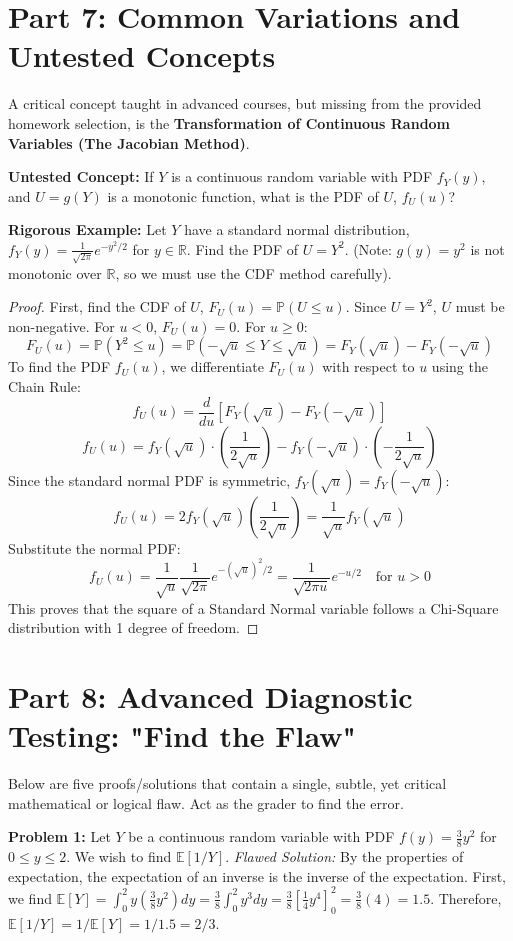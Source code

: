 \documentclass[11pt, a4paper]{article}
\theoremstyle{definition}
\theoremstyle{remark}
\newcommand{\R}{\mathbb{R}}
\newcommand{\E}{\mathbb{E}}
\newcommand{\Prob}{\mathbb{P}}
\begin{document}
\newpage
\section{Part 7: Common Variations and Untested Concepts}

A critical concept taught in advanced courses, but missing from the provided homework selection, is the \textbf{Transformation of Continuous Random Variables (The Jacobian Method)}. 

\textbf{Untested Concept:} If $Y$ is a continuous random variable with PDF $f_Y(y)$, and $U = g(Y)$ is a monotonic function, what is the PDF of $U$, $f_U(u)$?

\textbf{Rigorous Example:} Let $Y$ have a standard normal distribution, $f_Y(y) = \frac{1}{\sqrt{2\pi}} e^{-y^2/2}$ for $y \in \R$. Find the PDF of $U = Y^2$. (Note: $g(y) = y^2$ is not monotonic over $\R$, so we must use the CDF method carefully).

\begin{proof}
First, find the CDF of $U$, $F_U(u) = \Prob(U \le u)$.
Since $U = Y^2$, $U$ must be non-negative. For $u < 0$, $F_U(u) = 0$.
For $u \ge 0$:
\[ F_U(u) = \Prob(Y^2 \le u) = \Prob(-\sqrt{u} \le Y \le \sqrt{u}) = F_Y(\sqrt{u}) - F_Y(-\sqrt{u}) \]
To find the PDF $f_U(u)$, we differentiate $F_U(u)$ with respect to $u$ using the Chain Rule:
\[ f_U(u) = \frac{d}{du} \left[ F_Y(\sqrt{u}) - F_Y(-\sqrt{u}) \right] \]
\[ f_U(u) = f_Y(\sqrt{u}) \cdot \left( \frac{1}{2\sqrt{u}} \right) - f_Y(-\sqrt{u}) \cdot \left( -\frac{1}{2\sqrt{u}} \right) \]
Since the standard normal PDF is symmetric, $f_Y(\sqrt{u}) = f_Y(-\sqrt{u})$:
\[ f_U(u) = 2 f_Y(\sqrt{u}) \left( \frac{1}{2\sqrt{u}} \right) = \frac{1}{\sqrt{u}} f_Y(\sqrt{u}) \]
Substitute the normal PDF:
\[ f_U(u) = \frac{1}{\sqrt{u}} \frac{1}{\sqrt{2\pi}} e^{-(\sqrt{u})^2/2} = \frac{1}{\sqrt{2\pi u}} e^{-u/2} \quad \text{for } u > 0 \]
This proves that the square of a Standard Normal variable follows a Chi-Square distribution with 1 degree of freedom.
\end{proof}

\newpage
\section{Part 8: Advanced Diagnostic Testing: "Find the Flaw"}

Below are five proofs/solutions that contain a single, subtle, yet critical mathematical or logical flaw. Act as the grader to find the error.

\textbf{Problem 1:} Let $Y$ be a continuous random variable with PDF $f(y) = \frac{3}{8}y^2$ for $0 \le y \le 2$. We wish to find $\E[1/Y]$.
\textit{Flawed Solution:} By the properties of expectation, the expectation of an inverse is the inverse of the expectation. First, we find $\E[Y] = \int_{0}^{2} y(\frac{3}{8}y^2) dy = \frac{3}{8} \int_{0}^{2} y^3 dy = \frac{3}{8} [\frac{1}{4}y^4]_0^2 = \frac{3}{8}(4) = 1.5$. Therefore, $\E[1/Y] = 1 / \E[Y] = 1 / 1.5 = 2/3$.
\end{document}
